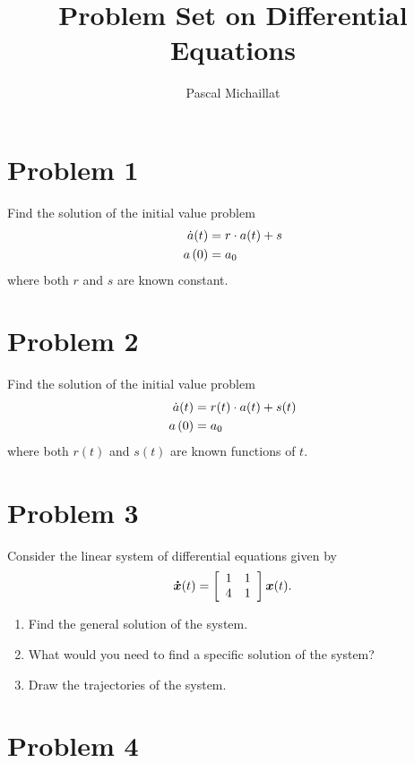 \documentclass[letterpaper,12pt,leqno]{article}
\begin{document}
\title{Problem Set on Differential Equations}
\author{Pascal Michaillat}
\date{}

\begin{titlepage}
\maketitle
\end{titlepage}

\section*{Problem 1}

Find the solution of the initial value problem 
\begin{align*}
\dot{a}(t) &=r\cdot a(t) +s \\
a\left( 0 \right) &=a_{0}
\end{align*}
where both $r$ and $s$ are known constant.

\section*{Problem 2}

Find the solution of the initial value problem 
\begin{align*}
\dot{a}(t) &=r(t)\cdot a(t) +s(t) \\
a\left( 0 \right) &=a_{0}
\end{align*}
where both  $r(t)$ and $s(t)$ are known functions of $t.$

\section*{Problem 3}

Consider the linear system of differential equations given by
\begin{equation*}
\bm{\dot{x}}(t)=\left[ 
\begin{array}{ll}
1 & 1 \\ 
4 & 1
\end{array} \right] \bm{x}(t).
\end{equation*}
\begin{enumerate}
\item Find the general solution of the system.
\item What would you need to find a specific solution of the system?
\item Draw the trajectories of the system.
\end{enumerate}

\section*{Problem 4}
\end{document}
